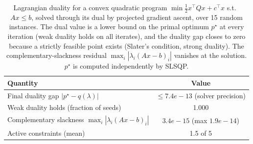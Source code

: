 \begin{table}[h]
\centering
\caption{Lagrangian duality for a convex quadratic program $\min \tfrac12 x^\top Q x + c^\top x$ s.t.\ $Ax \leq b$, solved through its dual by projected gradient ascent, over 15 random instances. The dual value is a lower bound on the primal optimum $p^\star$ at every iteration (weak duality holds on all iterates), and the duality gap closes to zero because a strictly feasible point exists (Slater's condition, strong duality). The complementary-slackness residual $\max_i |\lambda_i (Ax - b)_i|$ vanishes at the solution. $p^\star$ is computed independently by SLSQP.}
\label{tab:prelim_duality}
\begin{tabular}{lc}
\hline
Quantity & Value \\
\hline
Final duality gap $|p^\star - q(\lambda)|$ & $\leq 7.4e-13$ (solver precision) \\
Weak duality holds (fraction of seeds) & 1.000 \\
Complementary slackness $\max_i|\lambda_i(Ax-b)_i|$ & $3.4e-15$ (max $1.9e-14$) \\
Active constraints (mean) & 1.5 of 5 \\
\hline
\end{tabular}
\end{table}
